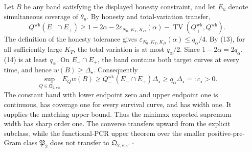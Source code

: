 Let \(B\) be any band satisfying the displayed honesty constraint, and let \(E_u\) denote simultaneous coverage of \(\theta_u\).  By honesty and total-variation transfer,
\[
 Q_-^{\mathrm{wk}}(E_-\cap E_+)
 \ge 1-2\alpha-2\varepsilon_{N_0,K_T,K_D}(\alpha)
      -\operatorname{TV}(Q_+^{\mathrm{wk}},Q_-^{\mathrm{wk}}). \tag{14}
\]
The definition of the honesty tolerance gives \(\varepsilon_{N_0,K_T,K_D}(\alpha)\le q_\alpha/4\).  By (13), for all sufficiently large \(K_T\), the total variation is at most \(q_\alpha/2\).  Since \(1-2\alpha=2q_\alpha\), (14) is at least \(q_\alpha\).  On \(E_-\cap E_+\), the band contains both target curves at every time, and hence \(w(B)\ge\Delta_\star\).  Consequently
\[
 \sup_{Q\in\mathfrak Q_{2,\mathrm{vis}}}E_Qw(B)
 \ge Q_-^{\mathrm{wk}}(E_-\cap E_+)\Delta_\star
 \ge q_\alpha\Delta_\star=:c_\star>0.                 \tag{15}
\]
The constant band with lower endpoint zero and upper endpoint one is continuous, has coverage one for every survival curve, and has width one.  It supplies the matching upper bound.  Thus the minimax expected supremum width has sharp order one.  The converse transfers upward from the explicit subclass, while the functional-PCR upper theorem over the smaller positive-pre-Gram class \(\mathfrak P_2\) does not transfer to \(\mathfrak Q_{2,\mathrm{vis}}\). \(\square\)